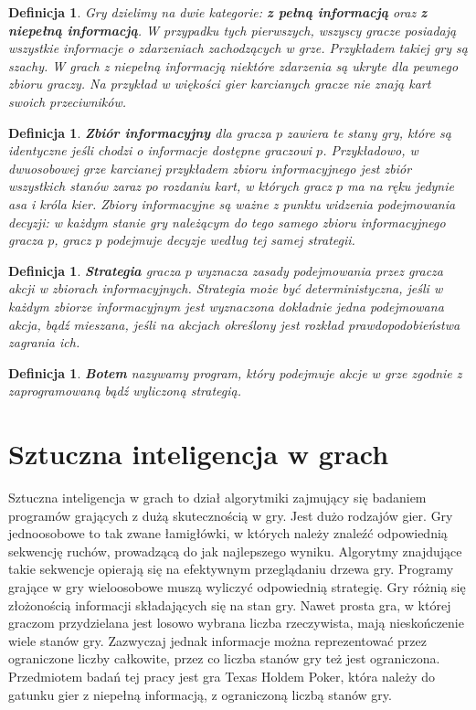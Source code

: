 \documentclass[licencjacka]{pracamgr}
\newtheorem{definition}[theorem]{Definicja}
\begin{document}
\begin{definition}
      Gry dzielimy na dwie kategorie: \textbf{z pełną informacją} oraz \textbf{z niepełną informacją}.
      W przypadku tych pierwszych, wszyscy gracze posiadają wszystkie informacje o zdarzeniach
      zachodzących w grze. Przykładem takiej gry są szachy. W grach z niepełną informacją niektóre
      zdarzenia są ukryte dla pewnego zbioru graczy. Na przykład w więkości gier karcianych gracze
      nie znają kart swoich przeciwników.
\end{definition}

\begin{definition}
      \textbf{Zbiór informacyjny} dla gracza $p$ zawiera te stany gry, które są identyczne jeśli chodzi
      o informacje dostępne graczowi $p$. Przykładowo, w dwuosobowej grze karcianej przykładem zbioru informacyjnego
      jest zbiór wszystkich stanów zaraz po rozdaniu kart, w których gracz $p$ ma na ręku jedynie asa i króla kier.
      Zbiory informacyjne są ważne z punktu widzenia podejmowania decyzji: w każdym stanie gry należącym do tego
      samego zbioru informacyjnego gracza $p$, gracz $p$ podejmuje decyzje według tej samej strategii.
\end{definition}

\begin{definition}
      \textbf{Strategia} gracza $p$ wyznacza zasady podejmowania przez gracza akcji w zbiorach informacyjnych.
      Strategia może być deterministyczna, jeśli w każdym zbiorze informacyjnym jest wyznaczona dokładnie
      jedna podejmowana akcja, bądź mieszana, jeśli na akcjach określony jest rozkład prawdopodobieństwa
      zagrania ich.
\end{definition}

\begin{definition}
      \textbf{Botem} nazywamy program, który podejmuje akcje w grze zgodnie z zaprogramowaną bądź wyliczoną strategią.
\end{definition}

\section{Sztuczna inteligencja w grach}

Sztuczna inteligencja w grach to dział algorytmiki zajmujący się badaniem programów grających
z dużą skutecznością w gry. Jest dużo rodzajów gier. Gry jednoosobowe to tak zwane łamigłówki, w których
należy znaleźć odpowiednią sekwencję ruchów, prowadzącą do jak najlepszego wyniku. Algorytmy znajdujące
takie sekwencje opierają się na efektywnym przeglądaniu drzewa gry. Programy grające w gry wieloosobowe
muszą wyliczyć odpowiednią strategię. Gry różnią się złożonością informacji składających się na stan gry.
Nawet prosta gra, w której graczom przydzielana jest losowo wybrana liczba rzeczywista, mają nieskończenie
wiele stanów gry. Zazwyczaj jednak informacje można reprezentować przez ograniczone liczby całkowite, przez co
liczba stanów gry też jest ograniczona. Przedmiotem badań tej pracy jest gra Texas Holdem Poker, która
należy do gatunku gier z niepełną informacją, z ograniczoną liczbą stanów gry.
\end{document}
